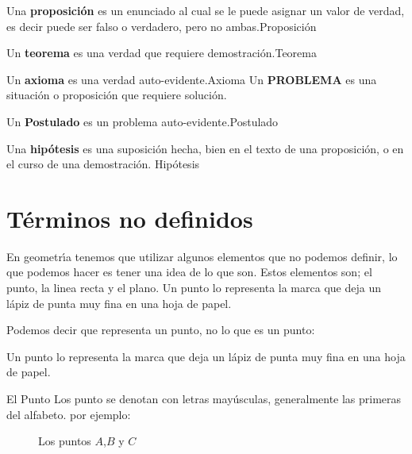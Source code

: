 \documentclass[12pt]{book}
\begin{document}
\begin{ideas}
\begin{ideas}{Una \textbf{proposición} es un enunciado al cual se le puede asignar un valor de verdad,
es decir puede ser falso o verdadero, pero no ambas.}{Proposición}
\begin{ideas}{Un \textbf{teorema} es una verdad que requiere demostración.}{Teorema}
 \end{ideas}
\begin{ideas}{Un \textbf{axioma} es una verdad auto-evidente.}{Axioma}
Un \textbf{PROBLEMA} es una situación o proposición que requiere solución.
 \end{ideas}
\begin{ideas}{Un \textbf{Postulado} es un problema auto-evidente.}{Postulado}
\end{ideas}
\begin{ideas}{Una \textbf{hipótesis} es una suposición hecha, bien en el texto
de una proposición, o en el
curso de una demostración.
}{Hipótesis}
\end{ideas}
\end{ideas}
\end{ideas}
\section{T\'{e}rminos no definidos}
En geometr\'{\i}a tenemos que utilizar algunos elementos que no podemos
definir, lo que podemos hacer es tener una idea de lo que son. Estos
elementos son; el punto, la linea recta y el plano.
Un punto lo representa la marca que deja un l\'{a}piz de punta muy fina en
una hoja de papel.
\begin{tndefinido}{Podemos decir que representa un punto, no lo que es un punto:

Un punto lo representa la marca que deja un l\'{a}piz de punta muy fina en
una hoja de papel.}{El Punto}
 Los punto se denotan con letras may\'{u}sculas, generalmente las primeras
del alfabeto. por ejemplo: \\
\begin{figure}[H]
\centering
\caption{Los puntos $A$,$B$ y $C$}
\label{fig1}
\end{figure}
\end{tndefinido}
\end{document}
